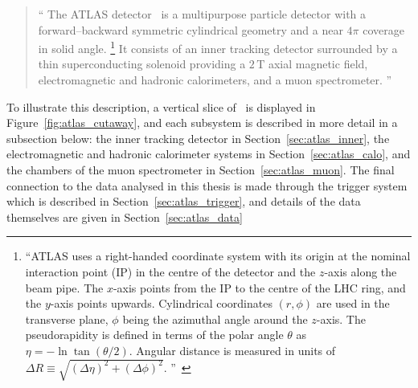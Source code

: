 \begin{quote}
``%
The ATLAS detector~\cite{atlas2008experiment} is a multipurpose particle
detector with a forward--backward symmetric cylindrical geometry and a near
$4\pi$ coverage in solid angle.%
\footnote{%
``ATLAS uses a right-handed coordinate system with its origin at the nominal
interaction point (IP) in the centre of the detector and the $z$-axis along the
beam pipe.
The $x$-axis points from the IP to the centre of the LHC ring, and the $y$-axis
points upwards.
Cylindrical coordinates $(r,\phi)$ are used in the transverse plane, $\phi$
being the azimuthal angle around the $z$-axis.
The pseudorapidity is defined in terms of the polar angle $\theta$ as
$\eta = -\ln \tan(\theta/2)$.
Angular distance is measured in units of
$\Delta R \equiv \sqrt{(\Delta\eta)^{2} + (\Delta\phi)^{2}}$.%
''\footnotemark~\cite{atlas2022searches}%
}
It consists of an inner tracking detector surrounded by a thin superconducting
solenoid providing a $2\,\mathrm{T}$ axial magnetic field, electromagnetic and
hadronic calorimeters, and a muon spectrometer.%
''~\cite{atlas2022searches}
\end{quote}
To illustrate this description, a vertical slice of \atlas\ is displayed in
Figure~\ref{fig:atlas_cutaway}, and each subsystem is described in more detail
in a subsection below:
the inner tracking detector in Section~\ref{sec:atlas_inner},
the electromagnetic and hadronic calorimeter systems in
Section~\ref{sec:atlas_calo},
and
the chambers of the muon spectrometer in Section~\ref{sec:atlas_muon}.
The final connection to the data analysed in this thesis is made through the
trigger system which is described in Section~\ref{sec:atlas_trigger},
and details of the data themselves are given in
Section~\ref{sec:atlas_data}



